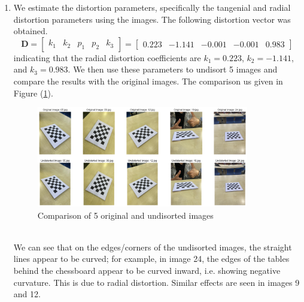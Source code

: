 \documentclass[10pt]{article}
\newcommand{\figref}[1]{Figure (\ref{fig:#1})}
\begin{document}
\begin{enumerate}
        \item We estimate the distortion parameters, specifically the tangenial and
        radial distortion parameters using the images. The following distortion vector
        was obtained.
        \begin{equation*}
            \mathbf{D} = \begin{bmatrix}
                k_{1} & k_{2} & p_{1} & p_{2} & k_{3}
            \end{bmatrix} = \begin{bmatrix}
                0.223 & -1.141 & -0.001 & -0.001 & 0.983
            \end{bmatrix}
        \end{equation*}
        indicating that the radial distortion coefficients are $k_{1} = 0.223$,
        $k_{2} = -1.141$, and $k_{3} = 0.983$. We then use these parameters to undisort
        5 images and compare the results with the original images. The comparison us given
        in \figref{distortions}.
        \begin{figure}[htbp]
            \begin{center}
                \includegraphics[width=0.875\textwidth]{Assets/Question-4/distortions.png}
                \caption{Comparison of 5 original and undisorted images}
                \label{fig:distortions}
            \end{center}
        \end{figure}
        \vspace*{0pt} \\
        We can see that on the edges/corners of the undisorted images, the straight lines
        appear to be curved; for example, in image 24, the edges of the tables behind the
        chessboard appear to be curved inward, i.e. showing negative curvature. This is
        due to radial distortion. Similar effects are seen in images 9 and 12.


\end{enumerate}
\end{document}
